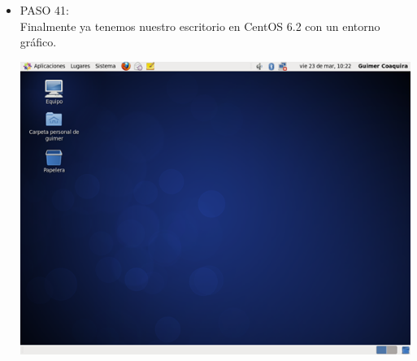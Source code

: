 \begin{itemize}
\item PASO 41:
\\Finalmente ya tenemos nuestro escritorio en CentOS 6.2 con un entorno gráfico.
		\begin{center}
		\includegraphics[width=13cm]{./Imagenes/41}
		\end{center}
	
	\end{itemize} 

